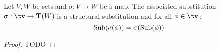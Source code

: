 \begin{prop}\label{logic:prop:FOPL:substitution:subformula}
Let $V,W$ be sets and $\sigma:V\to W$ be a map. The associated
substitution $\sigma:\tv\to{\bf T}(W)$ is a structural substitution
and for all $\phi\in\tv$\,:
    \[
        \mbox{\rm Sub}(\sigma(\phi))
        =
        \sigma(\mbox{\rm Sub}(\phi))
    \]
\end{prop}
\begin{proof}
    TODO
\end{proof}

